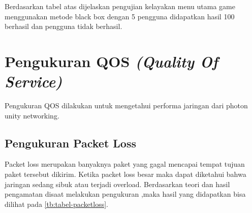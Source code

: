     Berdasarkan tabel atas dijelaskan pengujian kelayakan menu utama game menggunakan 
metode black box dengan 5 pengguna didapatkan hasil 100%
berhasil dan pengguna tidak berhasil.
\newpage
\section{Pengukuran QOS \textit{(Quality Of Service)}}
\noindent

Pengukuran QOS dilakukan untuk mengetahui performa jaringan dari photon unity networking.

\subsection{Pengukuran Packet Loss}
\noindent

Packet loss merupakan banyaknya paket yang gagal 
mencapai tempat tujuan paket tersebut dikirim. Ketika packet 
loss besar maka dapat diketahui bahwa jaringan sedang sibuk 
atau terjadi overload. Berdasarkan teori dan hasil pengamatan 
disaat melakukan pengukuran ,maka hasil yang didapatkan 
bisa dilihat pada \ref{tb:tabel-packetloss}.

